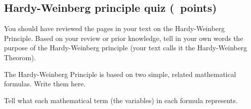 \documentclass[11pt, addpoints]{exam}
\begin{document}
\subsection*{Hardy-Weinberg principle quiz (\numpoints\ points)}

\begin{questions}

\question[3]
You should have reviewed the pages in your text on the Hardy-Weinberg Principle. Based on your review or prior knowledge, tell in your own words the purpose of the Hardy-Weinberg principle (your text calls it the Hardy-Weinberg Theorom).

\ifprintanswers\vspace*{\baselineskip}{\bfseries%
	The Hardy-Weinberg principle shows that allele and genotype frequencies cannot change in the absence of evolutionary process.}
\else
\fi

\question[2]
The Hardy-Weinberg Principle is based on two simple, related
mathematical formulas. Write them here. 

\question [5]
Tell what each mathematical term (the variables) in each formula represents.
\end{questions}
\end{document}
